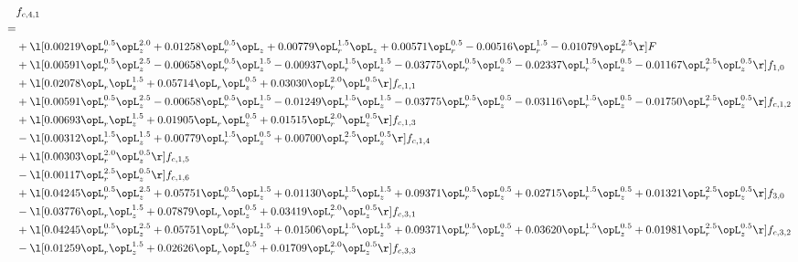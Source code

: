 \begin{alignat}{2} 
\label{eq:f_41_1} 
& f_{c,4,1} \nonumber \\ 
 = \\ 
& + \l[  0.00219 \opL_r^{0.5} \opL_z^{2.0} +  0.01258 \opL_r^{0.5} \opL_z +  0.00779 \opL_r^{1.5} \opL_z +  0.00571 \opL_r^{0.5}   -0.00516 \opL_r^{1.5}   -0.01079 \opL_r^{2.5}  \r] F \nonumber \\ 
& + \l[  0.00591 \opL_r^{0.5} \opL_z^{2.5}   -0.00658 \opL_r^{0.5} \opL_z^{1.5}   -0.00937 \opL_r^{1.5} \opL_z^{1.5}   -0.03775 \opL_r^{0.5} \opL_z^{0.5}   -0.02337 \opL_r^{1.5} \opL_z^{0.5}   -0.01167 \opL_r^{2.5} \opL_z^{0.5}  \r] f_{1,0} \nonumber \\ 
& + \l[  0.02078 \opL_r \opL_z^{1.5} +  0.05714 \opL_r \opL_z^{0.5} +  0.03030 \opL_r^{2.0} \opL_z^{0.5}  \r] f_{c,1,1} \nonumber \\ 
& + \l[  0.00591 \opL_r^{0.5} \opL_z^{2.5}   -0.00658 \opL_r^{0.5} \opL_z^{1.5}   -0.01249 \opL_r^{1.5} \opL_z^{1.5}   -0.03775 \opL_r^{0.5} \opL_z^{0.5}   -0.03116 \opL_r^{1.5} \opL_z^{0.5}   -0.01750 \opL_r^{2.5} \opL_z^{0.5}  \r] f_{c,1,2} \nonumber \\ 
& + \l[  0.00693 \opL_r \opL_z^{1.5} +  0.01905 \opL_r \opL_z^{0.5} +  0.01515 \opL_r^{2.0} \opL_z^{0.5}  \r] f_{c,1,3} \nonumber \\ 
& - \l[  0.00312 \opL_r^{1.5} \opL_z^{1.5} +  0.00779 \opL_r^{1.5} \opL_z^{0.5} +  0.00700 \opL_r^{2.5} \opL_z^{0.5}  \r] f_{c,1,4} \nonumber \\ 
& + \l[  0.00303 \opL_r^{2.0} \opL_z^{0.5}  \r] f_{c,1,5} \nonumber \\ 
& - \l[  0.00117 \opL_r^{2.5} \opL_z^{0.5}  \r] f_{c,1,6} \nonumber \\ 
& + \l[  0.04245 \opL_r^{0.5} \opL_z^{2.5} +  0.05751 \opL_r^{0.5} \opL_z^{1.5} +  0.01130 \opL_r^{1.5} \opL_z^{1.5} +  0.09371 \opL_r^{0.5} \opL_z^{0.5} +  0.02715 \opL_r^{1.5} \opL_z^{0.5} +  0.01321 \opL_r^{2.5} \opL_z^{0.5}  \r] f_{3,0} \nonumber \\ 
& - \l[  0.03776 \opL_r \opL_z^{1.5} +  0.07879 \opL_r \opL_z^{0.5} +  0.03419 \opL_r^{2.0} \opL_z^{0.5}  \r] f_{c,3,1} \nonumber \\ 
& + \l[  0.04245 \opL_r^{0.5} \opL_z^{2.5} +  0.05751 \opL_r^{0.5} \opL_z^{1.5} +  0.01506 \opL_r^{1.5} \opL_z^{1.5} +  0.09371 \opL_r^{0.5} \opL_z^{0.5} +  0.03620 \opL_r^{1.5} \opL_z^{0.5} +  0.01981 \opL_r^{2.5} \opL_z^{0.5}  \r] f_{c,3,2} \nonumber \\ 
& - \l[  0.01259 \opL_r \opL_z^{1.5} +  0.02626 \opL_r \opL_z^{0.5} +  0.01709 \opL_r^{2.0} \opL_z^{0.5}  \r] f_{c,3,3} \nonumber \\ 

\end{alignat}
